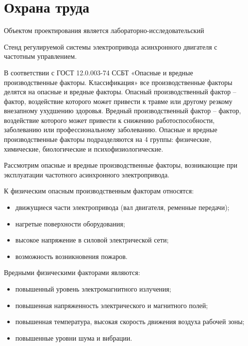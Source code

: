\section{Охрана труда}

        Объектом проектирования является лабораторно-исследовательский 

        Стенд регулируемой системы электропривода асинхронного двигателя с
        частотным управлением.

        В соответствии с ГОСТ 12.0.003-74 ССБТ «Опасные и вредные
        производственные факторы.  Классификация» все производственные факторы
        делятся на опасные и вредные факторы. Опасный производственный фактор –
        фактор, воздействие которого может привести к травме или другому
        резкому внезапному ухудшению здоровья. Вредный производственный фактор
        – фактор, воздействие которого может привести к снижению
        работоспособности, заболеванию или профессиональному заболеванию.
        Опасные и вредные производственные факторы подразделяются на 4 группы:
        физические, химические, биологические и психофизиологические. 

        Рассмотрим опасные и вредные производственные факторы, возникающие при
        эксплуатации частотного асинхронного электропривода.

        К физическим опасным производственным факторам относятся:
        \begin{itemize}
            \item движущиеся части электропривода  (вал двигателя, ременные
                передачи);
            \item нагретые поверхности оборудования;
            \item высокое напряжение в силовой электрической сети; 
            \item возможность возникновения пожаров.
        \end{itemize}

       Вредными физическими факторами являются:
        \begin{itemize}
            \item повышенный уровень электромагнитного излучения;
            \item повышенная напряженность электрического и магнитного полей;
            \item повышенная температура, высокая скорость движения воздуха
                рабочей зоны;
            \item повышенные уровни шума и вибрации.
        \end{itemize}

